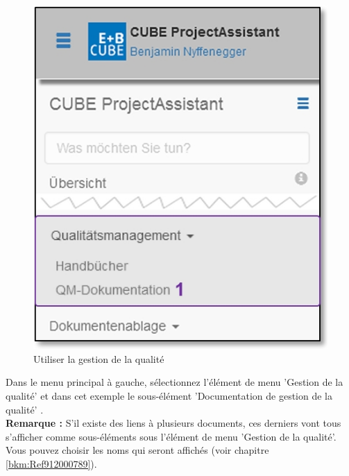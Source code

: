 \begin{figure}   %
  \vspace{-35pt}      %
  \begin{center}
    \includegraphics[width=1\linewidth]{../chapters/09_Qualitaetsmanagement/pictures/9-1_Menu_Qualitaetsmanagement.jpg}
  \end{center}
  \vspace{-20pt}
  \caption{Utiliser la gestion de la qualité}
  \vspace{-10pt}
\end{figure}

Dans le menu principal à gauche, sélectionnez l'élément de menu 'Gestion de la qualité' et dans cet exemple le sous-élément 'Documentation de gestion de la qualité' . \\
 
\textbf{Remarque :} S'il existe des liens à plusieurs documents, ces derniers vont tous s'afficher comme sous-éléments sous l'élément de menu 'Gestion de la qualité'. Vous pouvez choisir les noms qui seront affichés (voir chapitre \ref{bkm:Ref912000789}). \\

